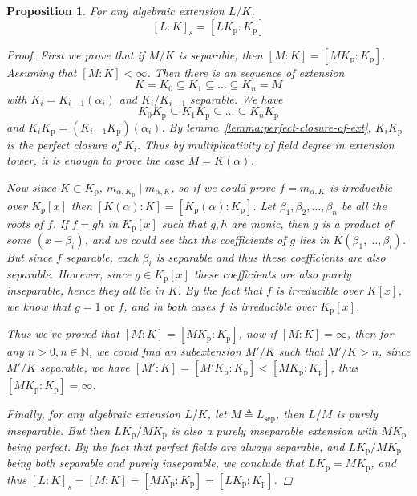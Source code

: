 \documentclass[a4paper]{article}
\newcommand{\defeq}{\triangleq}
\newcommand{\Nb}{\mathbb{N}}
\theoremstyle{remark}
\theoremstyle{definition}
\theoremstyle{definition}
\theoremstyle{plain}
\newtheorem{proposition}{Proposition}
\begin{document}
  \newcommand*{\Kp}{K_\mathrm{p}}
  \newcommand*{\Ks}{K_\mathrm{s}}
  \begin{proposition} \label{prop:separable-deg-equal-perfect-closure-deg}
    For any algebraic extension $L/K$,
    \[ [L: K]_s = [LK_\mathrm{p}: K_\mathrm{p}] \]

    \begin{proof}
      First we prove that if $M/K$ is separable, then $[M: K] = [MK_\mathrm{p}: K_\mathrm{p}]$.
      Assuming that $[M: K] < \infty$. Then there is an sequence of extension
      \[ K = K_0 \subseteq K_1 \subseteq \dots \subseteq K_n = M \]
      with $K_i = K_{i-1}(\alpha_i)$ and $K_i / K_{i-1}$ separable. We have
      \[ K_0 \Kp \subseteq K_1 \Kp \subseteq \dots \subseteq K_n \Kp \]
      and $K_i \Kp = (K_{i-1} \Kp)(\alpha_i)$. By lemma~\ref{lemma:perfect-closure-of-ext},
      $K_i \Kp$ is the perfect closure of $K_i$. Thus by multiplicativity of field degree
      in extension tower, it is enough to prove the case $M = K(\alpha)$.

      Now since $K \subset \Kp$, $m_{\alpha, \Kp} \mid m_{\alpha, K}$, so if we could
      prove $f = m_{\alpha, K}$ is irreducible over $\Kp[x]$ then $[K(\alpha): K] = [\Kp(\alpha): \Kp]$.
      Let $\beta_1, \beta_2, \dots, \beta_n$ be all the roots of $f$. If $f = gh$ in $\Kp[x]$
      such that $g, h$ are monic, then $g$ is a product of some $(x - \beta_i)$, and
      we could see that the coefficients of $g$ lies in $K(\beta_1, \dots, \beta_i)$.
      But since $f$ separable, each $\beta_i$ is separable and thus these coefficients are
      also separable. However, since $g \in \Kp[x]$ these coefficients are also purely inseparable,
      hence they all lie in $K$. By the fact that $f$ is irreducible over $K[x]$, we know
      that $g = 1 \text{ or } f$, and in both cases $f$ is irreducible over $\Kp[x]$.

      Thus we've proved that $[M: K] = [M \Kp: \Kp]$, now if $[M: K] = \infty$, then
      for any $n > 0, n \in \Nb$, we could find an subextension $M'/K$ such that $M'/K > n$,
      since $M'/K$ separable, we have $[M': K] = [M' \Kp: \Kp] < [M \Kp: \Kp]$, thus $[M \Kp: \Kp] = \infty$.

      Finally, for any algebraic extension $L/K$, let $M \defeq L_\text{sep}$, then $L / M$
      is purely inseparable. But then $L \Kp / M \Kp$ is also a purely inseparable extension
      with $M \Kp$ being perfect. By the fact that perfect fields are always separable,
      and $L \Kp / M \Kp$ being both separable and purely inseparable,
      we conclude that $L \Kp = M \Kp$, and thus $[L: K]_s = [M: K] = [M \Kp : \Kp] = [L \Kp: \Kp]$.
    \end{proof}
  \end{proposition}
\end{document}
